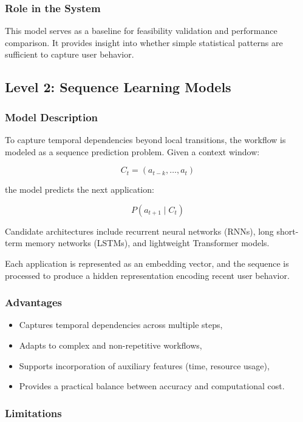 \documentclass[11pt]{article}
\begin{document}
\subsubsection{Role in the System}

This model serves as a baseline for feasibility validation and performance comparison. It provides insight into whether simple statistical patterns are sufficient to capture user behavior.

\subsection{Level 2: Sequence Learning Models}

\subsubsection{Model Description}

To capture temporal dependencies beyond local transitions, the workflow is modeled as a sequence prediction problem. Given a context window:

\[
C_t = (a_{t-k}, \dots, a_t)
\]

the model predicts the next application:

\[
P(a_{t+1} \mid C_t)
\]

Candidate architectures include recurrent neural networks (RNNs), long short-term memory networks (LSTMs), and lightweight Transformer models.

Each application is represented as an embedding vector, and the sequence is processed to produce a hidden representation encoding recent user behavior.

\subsubsection{Advantages}

\begin{itemize}
\item Captures temporal dependencies across multiple steps,
\item Adapts to complex and non-repetitive workflows,
\item Supports incorporation of auxiliary features (time, resource usage),
\item Provides a practical balance between accuracy and computational cost.
\end{itemize}

\subsubsection{Limitations}
\end{document}
